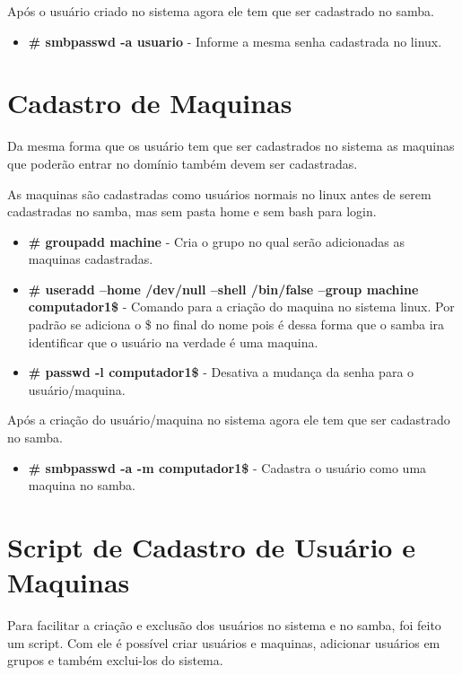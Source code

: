 Após o usuário criado no sistema agora ele tem que ser cadastrado no samba.

\begin{itemize}
	\item \textbf{\# smbpasswd -a usuario} - Informe a mesma senha cadastrada no linux.
\end{itemize}

\section{Cadastro de Maquinas}

Da mesma forma que os usuário tem que ser cadastrados no sistema as maquinas que poderão entrar no domínio também devem ser cadastradas.

As maquinas são cadastradas como usuários normais no linux antes de serem cadastradas no samba, mas sem pasta home e sem bash para login.

\begin{itemize}
	\item \textbf{\# groupadd machine} - Cria o grupo no qual serão adicionadas as maquinas cadastradas.
	\item \textbf{\# useradd --home /dev/null --shell /bin/false --group machine computador1\$} - 	Comando para a criação do maquina no sistema linux. Por padrão se adiciona o \$ no final do nome pois é dessa forma que o samba ira identificar que o usuário na verdade é uma maquina. 
	\item \textbf{\# passwd -l computador1\$} - Desativa a mudança da senha para o usuário/maquina.
\end{itemize}

Após a criação do usuário/maquina no sistema agora ele tem que ser cadastrado no samba.

\begin{itemize}	
	\item \textbf{\# smbpasswd -a -m computador1\$} - Cadastra o usuário como uma maquina no samba.
\end{itemize}


\section{Script de Cadastro de Usuário e Maquinas}

Para facilitar a criação e exclusão dos usuários no sistema e no samba, foi feito um script. Com ele é possível criar usuários e maquinas, adicionar usuários em grupos e também exclui-los do sistema.

